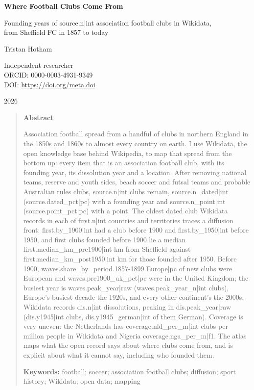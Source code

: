 \documentclass[11pt,a4paper]{article}
\begin{document}
\begin{center}
{\Large\bfseries Where Football Clubs Come From\par}
\vspace{0.4em}
{\large Founding years of {{source.n|int}} association football clubs in Wikidata,\\from Sheffield FC in 1857 to today\par}
\vspace{1.2em}
{\large Tristan Hotham\par}
\vspace{0.3em}
{\small Independent researcher\\
ORCID: 0000-0003-4931-9349\\
DOI: \href{https://doi.org/{{meta.doi}}}{https://doi.org/{{meta.doi}}}\par}
\vspace{0.8em}
2026
\end{center}

\begin{quote}
\small
\begin{center}\textbf{Abstract}\end{center}
Association football spread from a handful of clubs in northern England in the 1850s and 1860s to almost every country on earth. I use Wikidata, the open knowledge base behind Wikipedia, to map that spread from the bottom up: every item that is an association football club, with its founding year, its dissolution year and a location. After removing national teams, reserve and youth sides, beach soccer and futsal teams and probable Australian rules clubs, {{source.n|int}} clubs remain, {{source.n_dated|int}} ({{source.dated_pct|pc}}) with a founding year and {{source.n_point|int}} ({{source.point_pct|pc}}) with a point. The oldest dated club Wikidata records in each of {{first.n|int}} countries and territories traces a diffusion front: {{first.by_1900|int}} had a club before 1900 and {{first.by_1950|int}} before 1950, and first clubs founded before 1900 lie a median {{first.median_km_pre1900|int}} km from Sheffield against {{first.median_km_post1950|int}} km for those founded after 1950. Before 1900, {{waves.share_by_period.1857-1899.Europe|pc}} of new clubs were European and {{waves.pre1900_uk_pct|pc}} were in the United Kingdom; the busiest year is {{waves.peak_year|raw}} ({{waves.peak_year_n|int}} clubs), Europe's busiest decade the 1920s, and every other continent's the 2000s. Wikidata records {{dis.n|int}} dissolutions, peaking in {{dis.peak_year|raw}} ({{dis.y1945|int}} clubs, {{dis.y1945_german|int}} of them German). Coverage is very uneven: the Netherlands has {{coverage.nld_per_m|int}} clubs per million people in Wikidata and Nigeria {{coverage.nga_per_m|f1}}. The atlas maps what the open record says about where clubs come from, and is explicit about what it cannot say, including who founded them.

\textbf{Keywords:} football; soccer; association football clubs; diffusion; sport history; Wikidata; open data; mapping
\end{quote}
\end{document}
